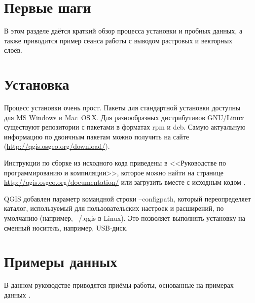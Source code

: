 
\section{Первые шаги}\label{label_getstarted}


В этом разделе даётся краткий обзор процесса установки \qg и пробных
данных, а также приводится пример сеанса работы с выводом растровых и векторных
слоёв.

\section{Установка}\label{label_installation}

Процесс установки \qg очень прост. Пакеты для стандартной установки
доступны для MS Windows и Mac~OS\,X. Для разнообразных дистрибутивов
GNU/Linux существуют репозитории с пакетами в форматах rpm и deb. Самую
актуальную информацию по двоичным пакетам можно получить на сайте
\qg (\url{http://qgis.osgeo.org/download/}).


Инструкции по сборке \qg из исходного кода приведены в <<Руководстве
по программированию и компиляции>>, которое можно найти на странице
\url{http://qgis.osgeo.org/documentation/} или загрузить вместе
с исходным кодом \qg.


QGIS добавлен параметр командной строки --configpath, который переопределяет
каталог, используемый для пользовательских настроек и расширений, по умолчанию
(например, ~/.qgis в Linux). Это позволяет выполнять установку \qg на сменный
носитель, например, USB-диск.

\section{Примеры данных}\label{label_sampledata}

В данном руководстве приводятся приёмы работы, основанные на примерах данных
\qg.

